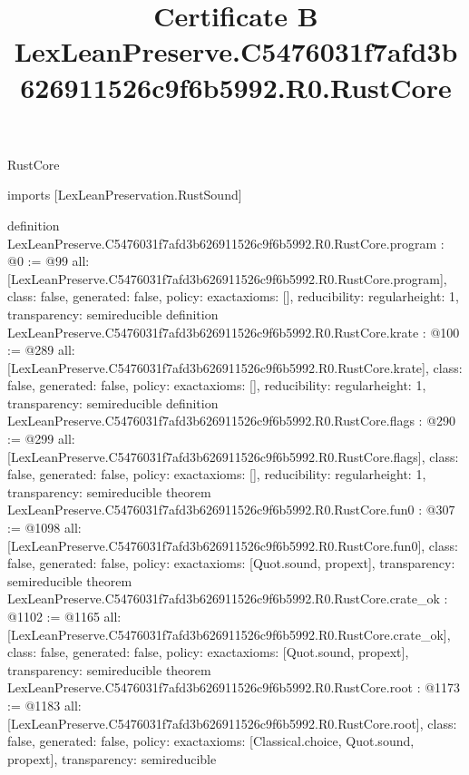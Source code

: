 \begin{lexlean}{RustCore}
\title{Certificate B LexLeanPreserve.C5476031f7afd3b626911526c9f6b5992.R0.RustCore}
\begin{coremodule}
imports [LexLeanPreservation.RustSound]

definition LexLeanPreserve.C5476031f7afd3b626911526c9f6b5992.R0.RustCore.program : @0 := @99 {
  all: [LexLeanPreserve.C5476031f7afd3b626911526c9f6b5992.R0.RustCore.program],
  class: false,
  generated: false,
  policy: exact{axioms: []},
  reducibility: regular{height: 1},
  transparency: semireducible
}
definition LexLeanPreserve.C5476031f7afd3b626911526c9f6b5992.R0.RustCore.krate : @100 := @289 {
  all: [LexLeanPreserve.C5476031f7afd3b626911526c9f6b5992.R0.RustCore.krate],
  class: false,
  generated: false,
  policy: exact{axioms: []},
  reducibility: regular{height: 1},
  transparency: semireducible
}
definition LexLeanPreserve.C5476031f7afd3b626911526c9f6b5992.R0.RustCore.flags : @290 := @299 {
  all: [LexLeanPreserve.C5476031f7afd3b626911526c9f6b5992.R0.RustCore.flags],
  class: false,
  generated: false,
  policy: exact{axioms: []},
  reducibility: regular{height: 1},
  transparency: semireducible
}
theorem LexLeanPreserve.C5476031f7afd3b626911526c9f6b5992.R0.RustCore.fun0 : @307 := @1098 {
  all: [LexLeanPreserve.C5476031f7afd3b626911526c9f6b5992.R0.RustCore.fun0],
  class: false,
  generated: false,
  policy: exact{axioms: [Quot.sound, propext]},
  transparency: semireducible
}
theorem LexLeanPreserve.C5476031f7afd3b626911526c9f6b5992.R0.RustCore.crate_ok : @1102 := @1165 {
  all: [LexLeanPreserve.C5476031f7afd3b626911526c9f6b5992.R0.RustCore.crate_ok],
  class: false,
  generated: false,
  policy: exact{axioms: [Quot.sound, propext]},
  transparency: semireducible
}
theorem LexLeanPreserve.C5476031f7afd3b626911526c9f6b5992.R0.RustCore.root : @1173 := @1183 {
  all: [LexLeanPreserve.C5476031f7afd3b626911526c9f6b5992.R0.RustCore.root],
  class: false,
  generated: false,
  policy: exact{axioms: [Classical.choice, Quot.sound, propext]},
  transparency: semireducible
}


\end{coremodule}
\end{lexlean}

